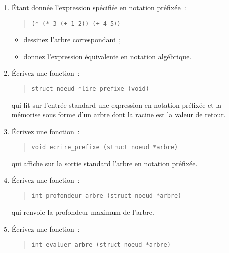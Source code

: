 \documentclass [twoside] {report}
\begin{document}
\begin {enumerate}
    \item Étant donnée l'expression spécifiée en notation préfixée~:

	\begin {quote}
	    \tt (* (* 3 (+ 1 2)) (+ 4 5))
	\end {quote}

	\begin {itemize}
	    \item dessinez l'arbre correspondant~;
	    \item donnez l'expression équivalente en notation algébrique.
	\end {itemize}
    
    \item Écrivez une fonction~:

\begin {quote}
\begin {verbatim}
struct noeud *lire_prefixe (void)
\end{verbatim}
\end {quote}

	qui lit sur l'entrée standard une expression en notation préfixée
	et la mémorise sous forme d'un arbre dont la racine est la
	valeur de retour.

    \item Écrivez une fonction~:

\begin {quote}
\begin {verbatim}
void ecrire_prefixe (struct noeud *arbre)
\end{verbatim}
\end {quote}

	qui affiche sur la sortie standard l'arbre en notation préfixée.
    
    \item Écrivez une fonction~:

\begin {quote}
\begin {verbatim}
int profondeur_arbre (struct noeud *arbre)
\end{verbatim}
\end {quote}

	qui renvoie la profondeur maximum de l'arbre.

    \item Écrivez une fonction~:

\begin {quote}
\begin {verbatim}
int evaluer_arbre (struct noeud *arbre)
\end{verbatim}
\end {quote}


\end{enumerate}
\end{document}
